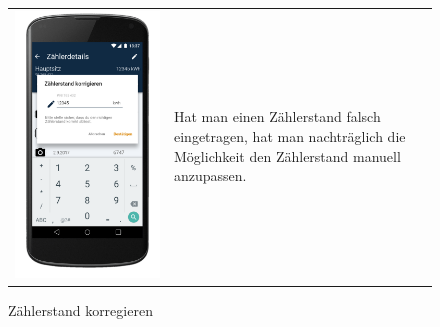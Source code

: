 \begin{figure}[h]
\begin{tabularx}{\textwidth}{X  X}
	\includegraphics[scale = 0.155]{img/AndroidMockup/correct} \caption{Zählerstand korregieren} & Hat man einen Zählerstand falsch eingetragen, hat man nachträglich die Möglichkeit den Zählerstand manuell anzupassen. \\ 
\end{tabularx}
\end{figure}

